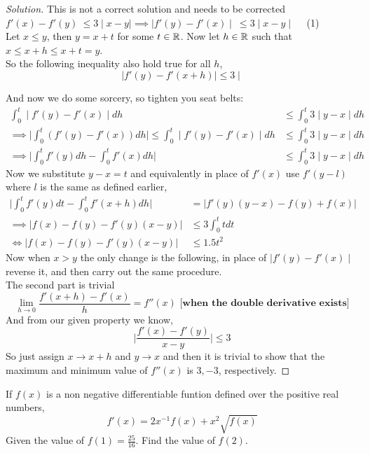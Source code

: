 \documentclass{scrartcl} %
\begin{document}
\begin{proof}[Solution]
This is not a correct solution and needs to be corrected $f'(x) - f'(y)\ \leq 3\mid x - y\mid \implies 	\mid f'(y) - f'(x)\mid \ \leq 3
	\mid x - y\mid$ \ \ (1) \\
Let $x \leq y$, then $y = x + t$ for some $t \in \mathbb R$. Now let $h \in \mathbb R$ such that
$x \leq x + h \leq x + t = y$.\\
So the following inequality also hold true for all $h$,
\[
\mid f'(y) - f'(x + h) \mid \leq 3 \mid 
\]

And now we do some sorcery, so tighten you seat belts:
\begin{align*}
	\int_0^t \mid f'(y) - f'(x)\mid dh \ &\leq \int_0^t 3\mid y - x\mid dh \\
	\implies \Bigg| \int_0^t \left(f'(y) - f'(x)\right) dh \Bigg|\leq \int_0^t
	\mid f'(y) - f'(x)\mid 
	dh &\leq \int_0^t 3\mid y - x\mid dh \\
	\implies \Bigg| \int_0^t f'(y) dh - \int_0^t f'(x) dh \Bigg| &\leq
	\int_0^t 3\mid y - x\mid dh 
\end{align*}
Now we substitute $y - x = t$ and equivalently in place of $f'(x)$ use $f'(y - l)$
where $l$ is the same as defined earlier,
\begin{align*}
	\Bigg| \int_0^t f'(y) dt - \int_0^t f'(x + h) dh \Bigg| &= 
	\Bigg|f'(y)(y-x) - f(y) + f(x)  \Bigg| \\
	\implies \Bigg| f(x) - f(y) - f'(y)(x-y)  \Bigg| &\leq 3\int_0^t t dt \\
		\iff \Bigg| f(x) - f(y) - f'(y)(x-y)  \Bigg|&\leq 1.5t^2
\end{align*}
Now when $x > y$ the only change is the following, in place of $\mid f'(y) - f'(x)
\mid$ reverse it, and then carry out the same procedure.
\\
The second part is trivial
\[
	\lim_{h \rightarrow 0} \dfrac{f'(x+h) - f'(x)}{h} = f''(x) \textbf{ [when 
	the double derivative exists]}
\]
And from our given property we know,
\[
	\Bigg|\dfrac{f'(x) - f'(y)}{x - y} \Bigg| \leq 3
\]
So just assign $x \rightarrow x + h$ and $y \rightarrow x$ and then it is trivial to 
show that the maximum and minimum value of $f''(x)$ is $\boxed{3, -3}$, respectively.
\end{proof}
\begin{example}
If $f(x)$ is a non negative differentiable funtion defined over the positive real
numbers,
\[
	f'(x) = 2x^{-1}f(x) + x^2\sqrt{f(x)}
\]
Given the value of $f(1) = \frac{25}{16}$. Find the value of $f(2)$.
\end{example}
\end{document}
